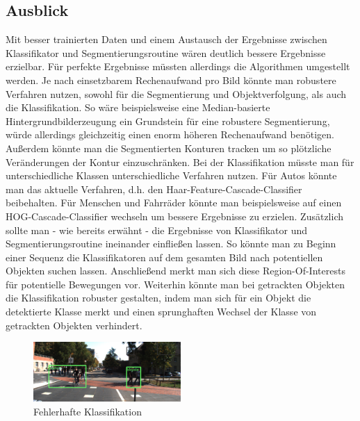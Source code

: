 \documentclass[conference]{IEEEtran}
\begin{document}
\subsection{Ausblick}
Mit besser trainierten Daten und einem Austausch der Ergebnisse zwischen Klassifikator und Segmentierungsroutine wären deutlich bessere Ergebnisse erzielbar.
Für perfekte Ergebnisse müssten allerdings die Algorithmen umgestellt werden. Je nach einsetzbarem Rechenaufwand pro Bild könnte man robustere Verfahren nutzen, sowohl für die Segmentierung und Objektverfolgung, als auch die Klassifikation. So wäre beispielsweise eine Median-basierte Hintergrundbilderzeugung ein Grundstein für eine robustere Segmentierung, würde allerdings gleichzeitig einen enorm höheren Rechenaufwand benötigen.
Außerdem könnte man die Segmentierten Konturen tracken um so plötzliche Veränderungen der Kontur einzuschränken.
Bei der Klassifikation müsste man für unterschiedliche Klassen unterschiedliche Verfahren nutzen. Für Autos könnte man das aktuelle Verfahren, d.h. den Haar-Feature-Cascade-Classifier beibehalten. Für Menschen und Fahrräder könnte man beispielsweise auf einen HOG-Cascade-Classifier wechseln um bessere Ergebnisse zu erzielen.
Zusätzlich sollte man - wie bereits erwähnt - die Ergebnisse von Klassifikator und Segmentierungsroutine ineinander einfließen lassen. So könnte man zu Beginn einer Sequenz die Klassifikatoren auf dem gesamten Bild nach potentiellen Objekten suchen lassen. Anschließend merkt man sich diese Region-Of-Interests für potentielle Bewegungen vor. Weiterhin könnte man bei getrackten Objekten die Klassifikation robuster gestalten, indem man sich für ein Objekt die detektierte Klasse merkt und einen sprunghaften Wechsel der Klasse von getrackten Objekten verhindert.


\begin{figure}
\includegraphics[width=0.5\textwidth]{ds06_failed}
\caption{Fehlerhafte Klassifikation}
\end{figure}




\end{document}
